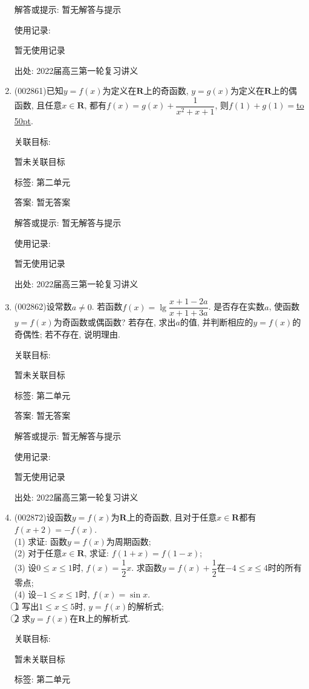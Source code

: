 \documentclass[10pt,a4paper]{article}
\newcommand{\blank}[1]{\underline{\hbox to #1pt{}}}
\begin{document}
\begin{enumerate}[1.]
解答或提示: 暂无解答与提示

使用记录:

暂无使用记录


出处: 2022届高三第一轮复习讲义
\item { (002861)}已知$y=f(x)$为定义在$\mathbf{R}$上的奇函数, $y=g(x)$为定义在$\mathbf{R}$上的偶函数, 且任意$x\in \mathbf{R}$, 都有$f(x)=g(x)+\dfrac{1}{x^2+x+1}$, 则$f(1)+g(1)=$\blank{50}.


关联目标:

暂未关联目标



标签: 第二单元

答案: 暂无答案

解答或提示: 暂无解答与提示

使用记录:

暂无使用记录


出处: 2022届高三第一轮复习讲义
\item { (002862)}设常数$a\ne 0$. 若函数$f(x)=\lg \dfrac{x+1-2a}{x+1+3a}$. 是否存在实数$a$, 使函数$y=f(x)$为奇函数或偶函数? 若存在, 求出$a$的值, 并判断相应的$y=f(x)$的奇偶性; 若不存在, 说明理由.


关联目标:

暂未关联目标



标签: 第二单元

答案: 暂无答案

解答或提示: 暂无解答与提示

使用记录:

暂无使用记录


出处: 2022届高三第一轮复习讲义
\item { (002872)}设函数$y=f(x)$为$\mathbf{R}$上的奇函数, 且对于任意$x\in \mathbf{R}$都有$f(x+2)=-f(x)$.\\
(1) 求证: 函数$y=f(x)$为周期函数;\\
(2) 对于任意$x\in \mathbf{R}$, 求证: $f(1+x)=f(1-x)$;\\
(3) 设$0\le x\le 1$时, $f(x)=\dfrac 12x$. 求函数$y=f(x)+\dfrac 12$在$-4\le x\le 4$时的所有零点;\\
(4) 设$-1\le x\le 1$时, $f(x)=\sin x$.\\
\textcircled{1} 写出$1\le x\le 5$时, $y=f(x)$的解析式;\\
\textcircled{2} 求$y=f(x)$在$\mathbf{R}$上的解析式.


关联目标:

暂未关联目标



标签: 第二单元


\end{enumerate}
\end{document}
